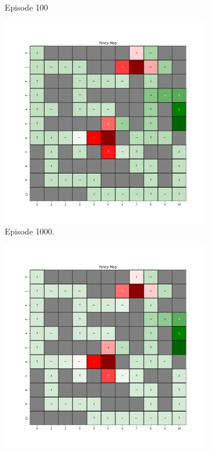 \documentclass{assignment}
\begin{document}
\begin{figure}[H]
\begin{subfigure}{0.3\textwidth}
    \caption{Episode 100}
    \end{subfigure}
    \begin{subfigure}{0.3\textwidth}
        \includegraphics[width=\textwidth]{figures/policy_td/gamma_sweep/policy_alpha_0.1_gamma_0.75_epsilon_0.2_iteration_1000.png}
    \caption{Episode 1000.}
    \end{subfigure}\hfill
    \begin{subfigure}{0.3\textwidth}
        \includegraphics[width=\textwidth]{figures/policy_td/gamma_sweep/policy_alpha_0.1_gamma_0.75_epsilon_0.2_iteration_5000.png}

\end{subfigure}
\end{figure}
\end{document}
